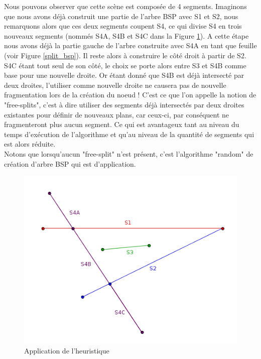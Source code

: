 \documentclass[11pt,a4paper]{article}
\begin{document}
Nous pouvons observer que cette scène est composée de 4 segments. Imaginons que nous avons déjà construit une partie de l'arbre BSP avec S1 et S2, nous remarquons alors que ces deux segments coupent S4, ce qui divise S4 en trois nouveaux segments (nommés S4A, S4B et S4C dans la Figure \ref{heuristic_splits}). A cette étape nous avons déjà la partie gauche de l'arbre construite avec S4A en tant que feuille (voir Figure \ref{split_bsp}). Il reste alors à construire le côté droit à partir de S2. S4C étant tout seul de son côté, le choix se porte alors entre S3 et S4B comme base pour une nouvelle droite. Or étant donné que S4B est déjà intersecté par deux droites, l'utiliser comme nouvelle droite ne causera pas de nouvelle fragmentation lors de la création du noeud ! C'est ce que l'on appelle la notion de "free-splits", c'est à dire utiliser des segments déjà intersectés par deux droites existantes pour définir de nouveaux plans, car ceux-ci, par conséquent ne fragmenteront plus aucun segment. Ce qui est avantageux tant au niveau du temps d'exécution de l'algorithme et qu'au niveau de la quantité de segments qui est alors réduite.\\

Notons que lorsqu'aucun "free-split" n'est présent, c'est l'algorithme "random" de création d'arbre BSP qui est d'application. 

\begin{figure}[!h]
\centering
\includegraphics[scale=0.5]{free_splits_1.png}
\caption{Application de l'heuristique}
\label{heuristic_splits}
\end{figure}
\end{document}
